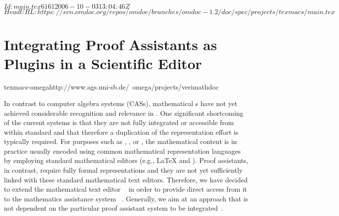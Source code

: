 \svnInfo $Id: main.tex 6161 2006-10-03 13:04:46Z  $
\svnKeyword $HeadURL: https://svn.omdoc.org/repos/omdoc/branches/omdoc-1.2/doc/spec/projects/texmacs/main.tex $

\section[Proof Assistants in Scientific Editors]{Integrating Proof Assistants as Plugins
  in a Scientific Editor}
\begin{project}{texmacs-omega}{http://www.ags.uni-sb.de/~omega/projects/verimathdoc}
\end{project}


In contrast to computer algebra systems (CASs), mathematical {s} have not yet achieved considerable recognition and relevance in
{}.  One significant shortcoming of the current systems is
that they are not fully integrated or accessible from within standard
{} and that therefore a duplication of the
representation effort is typically required. For purposes such as {},
{}, or {}, the mathematical content is in
practice usually encoded using common mathematical representation languages by employing
standard mathematical editors (e.g., {\LaTeX} and {\emacs}). Proof assistants, in
contrast, require fully formal representations and they are not yet sufficiently linked
with these standard mathematical text editors.  Therefore, we have decided to extend the
mathematical text editor {\texmacs}~\cite{VdH01} in order to provide direct access from it
to the mathematics assistance system {\OMEGA}~\cite{OMEGA02,SBA-05-a}. Generally, we aim
at an approach that is not dependent on the particular proof assistant system to be
integrated~\cite{ABFL-05-a}.

